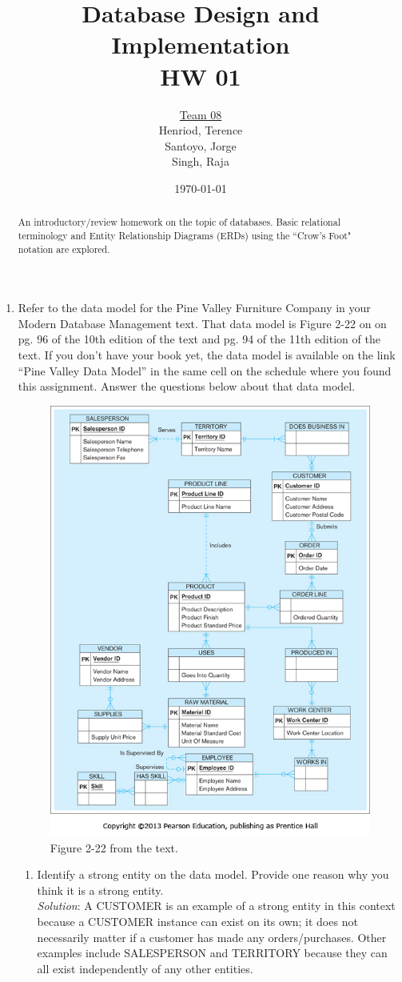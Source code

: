 \documentclass{article}
\title{Database Design and Implementation \\ HW 01}
\author{\underline{Team 08}\\Henriod, Terence\\Santoyo, Jorge \\Singh, Raja}
\date{\today}
\begin{document}
\maketitle

\begin{abstract}
An introductory/review homework on the topic of databases. Basic relational terminology and Entity Relationship Diagrams (ERDs) using the ``Crow's Foot" notation are explored.
\end{abstract}

\newpage
\begin{enumerate}
	\item Refer to the data model for the Pine Valley Furniture Company in your Modern Database Management text. That data model is Figure 2-22 on on pg. 96 of the 10th edition of the text and pg. 94 of the 11th edition of the text. If you don’t have your book yet, the data model is available on the link “Pine Valley Data Model” in the same cell on the schedule where you found this assignment. Answer the questions below about that data model.
	
  \begin{figure}[h!]
    \centering
    \includegraphics[width=.3\linewidth]{fig02_22}
    \caption{Figure 2-22 from the text.}
    \label{fig:figure_02_22}
  \end{figure}

	\begin{enumerate}
		\item Identify a strong entity on the data model. Provide one reason why you think it is a strong entity.\\

		\textit{Solution}: A CUSTOMER is an example of a strong entity in this context because a CUSTOMER instance can exist on its own; it does not necessarily matter if a customer has made any orders/purchases. Other examples include SALESPERSON and TERRITORY because they can all exist independently of any other entities.\\


\end{enumerate}
\end{enumerate}
\end{document}
